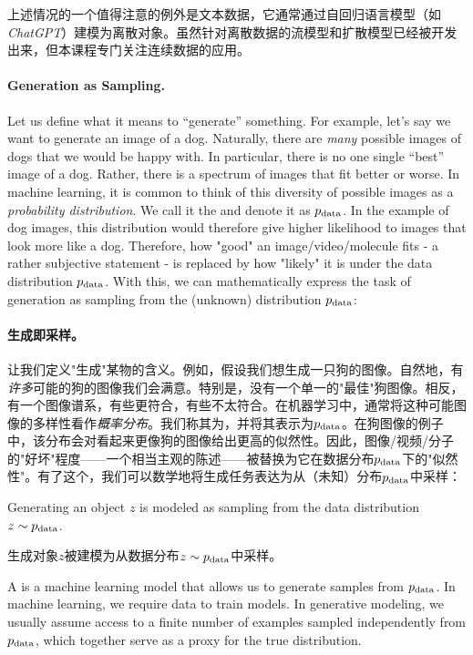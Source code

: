上述情况的一个值得注意的例外是文本数据，它通常通过自回归语言模型（如\emph{ChatGPT}）建模为离散对象。虽然针对离散数据的流模型和扩散模型已经被开发出来，但本课程专门关注连续数据的应用。


\paragraph{Generation as Sampling.}Let us define what it means to ``generate'' something. For example, let's say we want to generate an image of a dog. Naturally, there are \emph{many} possible images of dogs that we would be happy with. In particular, there is no one single ``best'' image of a dog. Rather, there is a spectrum of images that fit better or worse. In machine learning, it is common to think of this diversity of possible images as a \emph{probability distribution}. We call it the  and denote it as $p_{\rm{data}}$. In the example of dog images, this distribution would therefore give higher likelihood to images that look more like a dog. Therefore, how "good" an image/video/molecule fits - a rather subjective statement - is replaced by how "likely" it is under the data distribution $p_{\rm{data}}$. With this, we can mathematically express the task of generation as sampling from the (unknown) distribution $p_{\rm{data}}$:

\paragraph{生成即采样。}让我们定义"生成"某物的含义。例如，假设我们想生成一只狗的图像。自然地，有\emph{许多}可能的狗的图像我们会满意。特别是，没有一个单一的"最佳"狗图像。相反，有一个图像谱系，有些更符合，有些不太符合。在机器学习中，通常将这种可能图像的多样性看作\emph{概率分布}。我们称其为，并将其表示为$p_{\rm{data}}$。在狗图像的例子中，该分布会对看起来更像狗的图像给出更高的似然性。因此，图像/视频/分子的"好坏"程度——一个相当主观的陈述——被替换为它在数据分布$p_{\rm{data}}$下的"似然性"。有了这个，我们可以数学地将生成任务表达为从（未知）分布$p_{\rm{data}}$中采样：

\begin{ideabox}
    Generating an object $z$ is modeled as sampling from the data distribution $z\sim p_{\rm{data}}$.
    
    生成对象$z$被建模为从数据分布$z\sim p_{\rm{data}}$中采样。
\end{ideabox}
A  is a machine learning model that allows us to generate samples from $p_{\rm{data}}$. In machine learning, we require data to train models. In generative modeling, we usually assume access to a finite number of examples sampled independently from $p_{\rm{data}}$, which together serve as a proxy for the true distribution.

